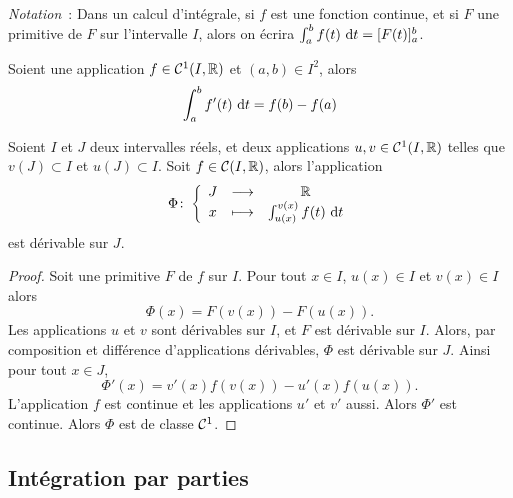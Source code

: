 \emph{Notation}~: Dans un calcul d'intégrale, si \(f\) est une fonction
continue,  et si \(F\) une primitive de \(F\) sur l'intervalle \(I\), alors on
écrira \(\int_a^b f(t)\,\mathop{}\mathopen{}\mathrm{d} t = [F(t)]_a^b\).

\begin{corth}
  Soient une application \(f \in \mathcal{C}^{1}(I,\mathbb{R})\) et \((a,b) \in I^2\), alors
  \begin{equation}
    \int_a^b f'(t)\,\mathop{}\mathopen{}\mathrm{d} t = f(b)-f(a)
  \end{equation}
\end{corth}

\begin{prop}
  Soient \(I\) et \(J\) deux intervalles réels, et deux applications \(u,v \in
  \mathcal{C}^{1}(I,\mathbb{R})\) telles que \(v(J) \subset I\) et \(u(J) \subset I\). Soit
  \(f \in \mathcal{C}(I,\mathbb{R})\), alors l'application
  \begin{equation}
    \Phi\colon\left\{\begin{array}{ccc}J & \longrightarrow &\mathbb{R}\\x & \longmapsto & \int_{u(x)}^{v(x)}f(t)\,\mathop{}\mathopen{}\mathrm{d} t\end{array}\right.
  \end{equation}
  est dérivable sur \(J\).
\end{prop}
\begin{proof}
  Soit une primitive \(F\) de \(f\) sur \(I\). Pour tout \(x \in I\), \(u(x) \in
  I\) et \(v(x) \in I\) alors
  \begin{equation}
    \Phi(x) = F(v(x))-F(u(x)).
  \end{equation}
  Les applications \(u\) et \(v\) sont dérivables sur \(I\), et \(F\) est
  dérivable sur \(I\). Alors, par composition et différence d'applications
  dérivables, \(\Phi\) est dérivable sur \(J\). Ainsi pour tout \(x \in J\),
  \begin{equation}
    \Phi'(x) = v'(x)f(v(x)) -u'(x)f(u(x)).
  \end{equation}
  L'application \(f\) est continue et les applications \(u'\) et \(v'\) aussi.
  Alors \(\Phi'\) est continue. Alors \(\Phi\) est de classe \(\mathcal{C}^{1}\).
\end{proof}

\subsection{Intégration par parties}

